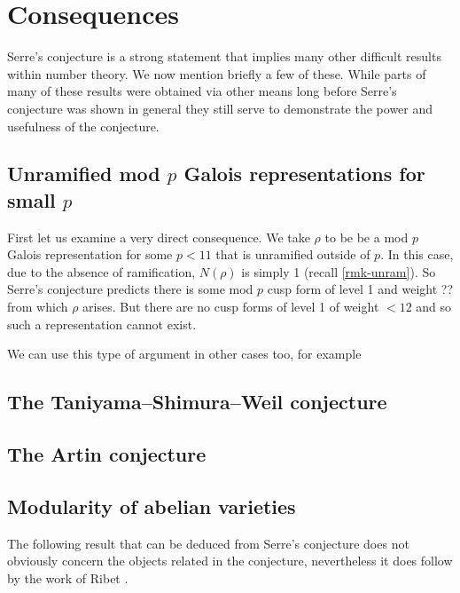 \documentclass[a4paper,12pt]{article}
\begin{document}
\section{Consequences}
Serre's conjecture is a strong statement that implies many other difficult results within number theory.
We now mention briefly a few of these.
While parts of many of these results were obtained via other means long before Serre's conjecture was shown in general they still serve to demonstrate the power and usefulness of the conjecture.


\subsection{Unramified mod $p$ Galois representations for small $p$}
First let us examine a very direct consequence. %
We take $\rho$ to be be a mod $p$ Galois representation for some $p < 11$ that is unramified outside of $p$.
In this case, due to the absence of ramification, $N(\rho)$ is simply 1 (recall \cref{rmk-unram}). %
So Serre's conjecture predicts there is some mod $p$ cusp form of level 1 and weight ?? from which $\rho$ arises.
But there are no cusp forms of level 1 of weight $< 12$ and so such a representation cannot exist.

We can use this type of argument in other cases too, for example


\subsection{The Taniyama--Shimura--Weil conjecture}\label{sec-tan}


\subsection{The Artin conjecture}\label{sec-artin}


\subsection{Modularity of abelian varieties}
The following result that can be deduced from Serre's conjecture does not obviously concern the objects related in the conjecture, nevertheless it does follow by the work of Ribet \cite{Ribet}.




\end{document}
